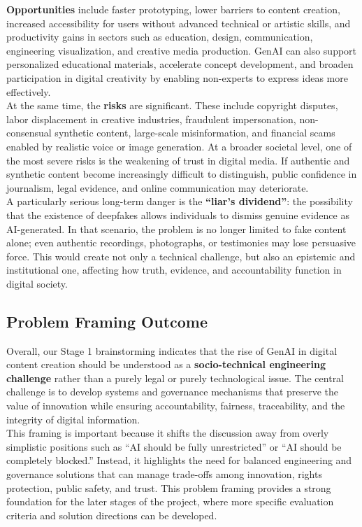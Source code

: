 \textbf{Opportunities} include faster prototyping, lower barriers to content creation, increased accessibility for users without advanced technical or artistic skills, and productivity gains in sectors such as education, design, communication, engineering visualization, and creative media production. GenAI can also support personalized educational materials, accelerate concept development, and broaden participation in digital creativity by enabling non-experts to express ideas more effectively. \\

At the same time, the \textbf{risks} are significant. These include copyright disputes, labor displacement in creative industries, fraudulent impersonation, non-consensual synthetic content, large-scale misinformation, and financial scams enabled by realistic voice or image generation. At a broader societal level, one of the most severe risks is the weakening of trust in digital media. If authentic and synthetic content become increasingly difficult to distinguish, public confidence in journalism, legal evidence, and online communication may deteriorate. \\

A particularly serious long-term danger is the \textbf{``liar's dividend''}: the possibility that the existence of deepfakes allows individuals to dismiss genuine evidence as AI-generated. In that scenario, the problem is no longer limited to fake content alone; even authentic recordings, photographs, or testimonies may lose persuasive force. This would create not only a technical challenge, but also an epistemic and institutional one, affecting how truth, evidence, and accountability function in digital society.

\newpage
\subsection{Problem Framing Outcome}
Overall, our Stage 1 brainstorming indicates that the rise of GenAI in digital content creation should be understood as a \textbf{socio-technical engineering challenge} rather than a purely legal or purely technological issue. The central challenge is to develop systems and governance mechanisms that preserve the value of innovation while ensuring accountability, fairness, traceability, and the integrity of digital information. \\

This framing is important because it shifts the discussion away from overly simplistic positions such as ``AI should be fully unrestricted'' or ``AI should be completely blocked.'' Instead, it highlights the need for balanced engineering and governance solutions that can manage trade-offs among innovation, rights protection, public safety, and trust. This problem framing provides a strong foundation for the later stages of the project, where more specific evaluation criteria and solution directions can be developed.
